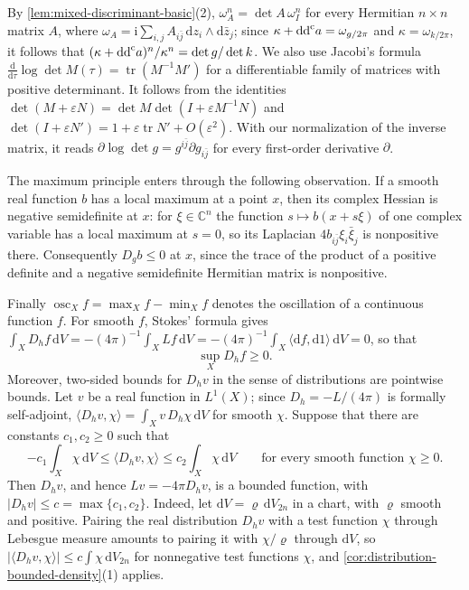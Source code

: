 By \cref{lem:mixed-discriminant-basic}(2), $\omega_A^n=\det A\,\omega_I^n$ for every Hermitian $n\times n$ matrix $A$, where $\omega_A=\mathrm i\sum_{i,j}A_{i\bar j}\,\mathrm dz_i\wedge\mathrm d\bar z_j$; since $\kappa+\mathrm{dd}^{\mathrm{c}} a=\omega_{g/2\pi}$ and $\kappa=\omega_{k/2\pi}$, it follows that $(\kappa+\mathrm{dd}^{\mathrm{c}} a)^n/\kappa^n=\det g/\det k$. We also use Jacobi's formula $\frac{\mathrm d}{\mathrm d\tau}\log\det M(\tau)=\operatorname{tr}(M^{-1}M')$ for a differentiable family of matrices with positive determinant. It follows from the identities $\det(M+\varepsilon N)=\det M\det(I+\varepsilon M^{-1}N)$ and $\det(I+\varepsilon N')=1+\varepsilon\operatorname{tr}N'+O(\varepsilon^2)$. With our normalization of the inverse matrix, it reads $\partial\log\det g=g^{i\bar j}\partial g_{i\bar j}$ for every first-order derivative $\partial$.

The maximum principle enters through the following observation. If a smooth real function $b$ has a local maximum at a point $x$, then its complex Hessian is negative semidefinite at $x$: for $\xi\in\mathbb C^n$ the function $s\mapsto b(x+s\xi)$ of one complex variable has a local maximum at $s=0$, so its Laplacian $4b_{i\bar j}\xi_i\bar\xi_j$ is nonpositive there. Consequently $D_gb\leq0$ at $x$, since the trace of the product of a positive definite and a negative semidefinite Hermitian matrix is nonpositive.

Finally $\operatorname{osc}_Xf=\max_Xf-\min_Xf$ denotes the oscillation of a continuous function $f$. For smooth $f$, Stokes' formula gives $\int_XD_hf\,\mathrm dV=-(4\pi)^{-1}\int_XLf\,\mathrm dV=-(4\pi)^{-1}\int_X\langle\mathrm df,\mathrm d1\rangle\,\mathrm dV=0$, so that
\begin{equation}\label{eq:penalized-upper-laplacian-nonnegative}
 \sup_XD_hf\geq0.
\end{equation}
Moreover, two-sided bounds for $D_hv$ in the sense of distributions are pointwise bounds. Let $v$ be a real function in $L^1(X)$; since $D_h=-L/(4\pi)$ is formally self-adjoint, $\langle D_hv,\chi\rangle=\int_Xv\,D_h\chi\,\mathrm dV$ for smooth $\chi$. Suppose that there are constants $c_1,c_2\geq0$ such that
\begin{equation}\label{eq:penalized-distributional-trace-bound}
 -c_1\int_X\chi\,\mathrm dV\leq\langle D_hv,\chi\rangle\leq c_2\int_X\chi\,\mathrm dV
 \qquad\text{for every smooth function }\chi\geq0.
\end{equation}
Then $D_hv$, and hence $Lv=-4\pi D_hv$, is a bounded function, with $|D_hv|\leq c=\max\{c_1,c_2\}$. Indeed, let $\mathrm dV=\varrho\,\mathrm dV_{2n}$ in a chart, with $\varrho$ smooth and positive. Pairing the real distribution $D_hv$ with a test function $\chi$ through Lebesgue measure amounts to pairing it with $\chi/\varrho$ through $\mathrm dV$, so $|\langle D_hv,\chi\rangle|\leq c\int\chi\,\mathrm dV_{2n}$ for nonnegative test functions $\chi$, and \cref{cor:distribution-bounded-density}(1) applies.

